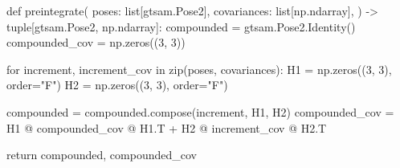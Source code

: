 \begin{pythoncode}
def preintegrate(
    poses: list[gtsam.Pose2],
    covariances: list[np.ndarray],
) -> tuple[gtsam.Pose2, np.ndarray]:
    compounded = gtsam.Pose2.Identity()
    compounded_cov = np.zeros((3, 3))

    for increment, increment_cov in zip(poses, covariances):
        H1 = np.zeros((3, 3), order="F")
        H2 = np.zeros((3, 3), order="F")

        compounded = compounded.compose(increment, H1, H2)
        compounded_cov = H1 @ compounded_cov @ H1.T + H2 @ increment_cov @ H2.T

    return compounded, compounded_cov
\end{pythoncode}

